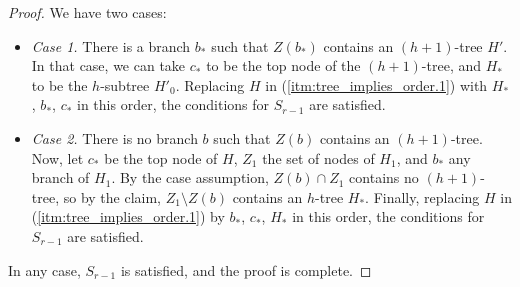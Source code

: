 \begin{proof}
            We have two cases:
            \begin{itemize}
                \item \emph{Case 1.} There is a branch $b_*$ such that $Z(b_*)$ contains an $(h+1)$-tree $H'$.
                    In that case, we can take $c_*$ to be the top node of the $(h+1)$-tree, and $H_*$ to be the
                    $h$-subtree $H'_0$.
                    Replacing $H$ in (\ref{itm:tree_implies_order.1}) with $H_*$, $b_*$, $c_*$ in this order, the
                    conditions for $S_{r-1}$ are satisfied.
                \item \emph{Case 2.} There is no branch $b$ such that $Z(b)$ contains an $(h+1)$-tree.
                    Now, let $c_*$ be the top node of $H$, $Z_1$ the set of nodes of $H_1$, and
                    $b_*$ any branch of $H_1$.
                    By the case assumption, $Z(b) \cap Z_1$ contains no $(h+1)$-tree, so by the claim,
                    $Z_1 \setminus Z(b)$ contains an $h$-tree $H_*$.
                    Finally, replacing $H$ in (\ref{itm:tree_implies_order.1}) by $b_*$, $c_*$, $H_*$ in this order, the
                    conditions for $S_{r-1}$ are satisfied.
            \end{itemize}
            In any case, $S_{r-1}$ is satisfied, and the proof is complete.
        \end{proof}